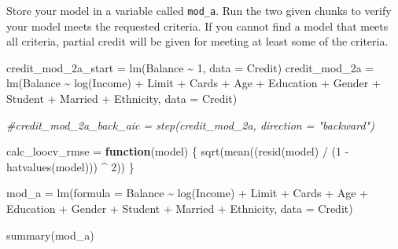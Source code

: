 \documentclass[
]{article}
\newenvironment{Shaded}{\begin{snugshade}}{\end{snugshade}}
\newcommand{\AttributeTok}[1]{\textcolor[rgb]{0.77,0.63,0.00}{#1}}
\newcommand{\CommentTok}[1]{\textcolor[rgb]{0.56,0.35,0.01}{\textit{#1}}}
\newcommand{\ControlFlowTok}[1]{\textcolor[rgb]{0.13,0.29,0.53}{\textbf{#1}}}
\newcommand{\DecValTok}[1]{\textcolor[rgb]{0.00,0.00,0.81}{#1}}
\newcommand{\FunctionTok}[1]{\textcolor[rgb]{0.00,0.00,0.00}{#1}}
\newcommand{\NormalTok}[1]{#1}
\newcommand{\OtherTok}[1]{\textcolor[rgb]{0.56,0.35,0.01}{#1}}
\newcommand{\SpecialCharTok}[1]{\textcolor[rgb]{0.00,0.00,0.00}{#1}}
\begin{document}
Store your model in a variable called \texttt{mod\_a}. Run the two given
chunks to verify your model meets the requested criteria. If you cannot
find a model that meets all criteria, partial credit will be given for
meeting at least some of the criteria.

\begin{Shaded}
\begin{Highlighting}[]
\NormalTok{credit\_mod\_2a\_start }\OtherTok{=} \FunctionTok{lm}\NormalTok{(Balance }\SpecialCharTok{\textasciitilde{}} \DecValTok{1}\NormalTok{, }\AttributeTok{data =}\NormalTok{ Credit)}
\NormalTok{credit\_mod\_2a }\OtherTok{=} \FunctionTok{lm}\NormalTok{(Balance }\SpecialCharTok{\textasciitilde{}} \FunctionTok{log}\NormalTok{(Income) }\SpecialCharTok{+}\NormalTok{ Limit }\SpecialCharTok{+}\NormalTok{ Cards }\SpecialCharTok{+}\NormalTok{ Age }\SpecialCharTok{+}\NormalTok{ Education }\SpecialCharTok{+}\NormalTok{ Gender}
                   \SpecialCharTok{+}\NormalTok{ Student }\SpecialCharTok{+}\NormalTok{ Married }\SpecialCharTok{+}\NormalTok{ Ethnicity, }\AttributeTok{data =}\NormalTok{ Credit)}

\CommentTok{\#credit\_mod\_2a\_back\_aic = step(credit\_mod\_2a, direction = "backward")}



\NormalTok{calc\_loocv\_rmse }\OtherTok{=} \ControlFlowTok{function}\NormalTok{(model) \{}
  \FunctionTok{sqrt}\NormalTok{(}\FunctionTok{mean}\NormalTok{((}\FunctionTok{resid}\NormalTok{(model) }\SpecialCharTok{/}\NormalTok{ (}\DecValTok{1} \SpecialCharTok{{-}} \FunctionTok{hatvalues}\NormalTok{(model))) }\SpecialCharTok{\^{}} \DecValTok{2}\NormalTok{))}
\NormalTok{\}}


\NormalTok{mod\_a }\OtherTok{=} \FunctionTok{lm}\NormalTok{(}\AttributeTok{formula =}\NormalTok{ Balance }\SpecialCharTok{\textasciitilde{}} \FunctionTok{log}\NormalTok{(Income) }\SpecialCharTok{+}\NormalTok{ Limit }\SpecialCharTok{+}\NormalTok{ Cards }\SpecialCharTok{+}\NormalTok{ Age }\SpecialCharTok{+}\NormalTok{ Education }\SpecialCharTok{+} 
\NormalTok{    Gender }\SpecialCharTok{+}\NormalTok{ Student }\SpecialCharTok{+}\NormalTok{ Married }\SpecialCharTok{+}\NormalTok{ Ethnicity, }\AttributeTok{data =}\NormalTok{ Credit)}

\FunctionTok{summary}\NormalTok{(mod\_a)}
\end{Highlighting}
\end{Shaded}
\end{document}
